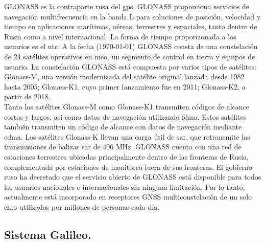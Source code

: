 \begin{justify}
    GLONASS es la contraparte rusa del \gls{gps}. GLONASS proporciona servicios de navegación multifrecuencia en la banda L para soluciones de posición, velocidad y tiempo
    en aplicaciones marítimas, aéreas, terrestres y espaciales, tanto dentro de Rusia como a nivel internacional. La forma de tiempo proporcionada a los usuarios es el \gls{utc}.
    A la fecha (\today) GLONASS consta de una constelación de 24 satélites operativos en \gls{meo}, un segmento de control en tierra y equipos de usuario. La constelación GLONASS
    está compuesta por varios tipos de satélites: Glonass-M, una versión modernizada del satélite original lanzada desde 1982 hasta 2005; Glonass-K1, cuyo primer
    lanzamiento fue en 2011; Glonass-K2, a partir de 2018.\\
    
    Tanto los satélites Glonass-M como Glonass-K1 transmiten códigos de alcance cortos y largos, así como datos de navegación utilizando \gls{fdma}. Estos satélites también
    transmiten un código de alcance con datos de navegación mediante \gls{cdma}. Los satélites Glonass-K llevan una carga útil de \gls{sar}, que retransmite las
    transmisiones de balizas \gls{sar} de 406 MHz. GLONASS cuenta con una red de estaciones terrestres
    ubicadas principalmente dentro de las fronteras de Rusia, complementada por estaciones de monitoreo fuera de sus fronteras. El gobierno ruso ha decretado que el servicio abierto
    de GLONASS está disponible para todos los usuarios nacionales e internacionales sin ninguna limitación. Por lo tanto, actualmente está incorporado en receptores GNSS
    multiconstelación de un solo chip utilizados por millones de personas cada día.
\end{justify}

\subsection*{\fontsize{12}{18}\selectfont Sistema Galileo.}

